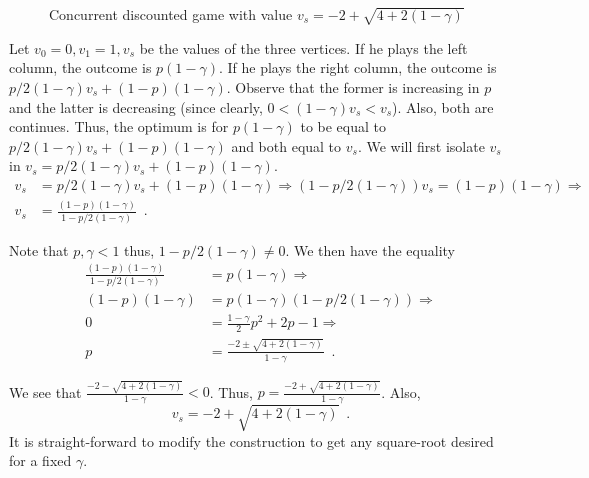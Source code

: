 \begin{figure}

\center
{}
\caption{Concurrent discounted game with value $v_s=-2+\sqrt{4+2(1-\gamma)}$}\label{7-fig:sqroot}
\end{figure}





Let $v_0=0,v_1=1,v_s$ be the values of the three vertices. If he plays the left column, the outcome is $p(1-\gamma)$.
If he plays the right column, the outcome is $p/2(1-\gamma)v_s+(1-p)(1-\gamma)$. Observe that the former is increasing in $p$ and the latter is decreasing (since clearly, $0<(1-\gamma)v_s<v_s$). Also, both are continues. Thus, the optimum is for $p(1-\gamma)$ to be equal to $p/2(1-\gamma)v_s+(1-p)(1-\gamma)$ and both equal to $v_s$.
We will first isolate $v_s$ in $v_s=p/2(1-\gamma)v_s+(1-p)(1-\gamma)$.
\begin{align*}
v_s&=p/2(1-\gamma)v_s+(1-p)(1-\gamma)\Rightarrow (1-p/2(1-\gamma))v_s=(1-p)(1-\gamma)\Rightarrow \\
v_s&=\frac{(1-p)(1-\gamma)}{1-p/2(1-\gamma)}\enspace .
\end{align*}

Note that $p,\gamma<1$ thus, $1-p/2(1-\gamma)\neq 0$.
We then have the equality 
\begin{align*}
\frac{(1-p)(1-\gamma)}{1-p/2(1-\gamma)}&=p(1-\gamma)\Rightarrow\\(1-p)(1-\gamma)&=p(1-\gamma)(1-p/2(1-\gamma))\Rightarrow\\
0&=\frac{1-\gamma}{2} p^2+2p-1\Rightarrow \\
p&=\frac{-2\pm\sqrt{4+2(1-\gamma)}}{1-\gamma} \enspace .
\end{align*}

We see that $\frac{-2-\sqrt{4+2(1-\gamma)}}{1-\gamma}<0$. Thus, $p=\frac{-2+\sqrt{4+2(1-\gamma)}}{1-\gamma}$.
Also, \[v_s=-2+\sqrt{4+2(1-\gamma)}\enspace .\] 
It is straight-forward to modify the construction to get any square-root desired for a fixed $\gamma$. 



